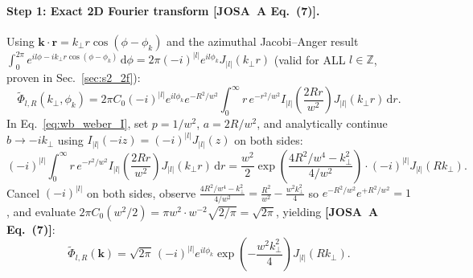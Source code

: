 \documentclass[10pt,letterpaper]{article}
\newcommand{\abs}[1]{\lvert #1 \rvert}
\newcommand{\dd}{\mathrm{d}}
\newcommand{\josa}[1]{\textbf{[JOSA~A Eq.~(#1)]}}
\numberwithin{equation}{section}
\begin{document}
\paragraph*{Step 1: Exact 2D Fourier transform \josa{7}.}
Using $\mathbf{k}\cdot\mathbf{r} = k_\perp r\cos(\phi - \phi_k)$ and the azimuthal Jacobi--Anger result $\int_0^{2\pi} e^{il\phi - ik_\perp r\cos(\phi-\phi_k)}\,\dd\phi = 2\pi(-i)^{\abs{l}} e^{il\phi_k} J_{\abs{l}}(k_\perp r)$ (valid for ALL $l \in \mathbb{Z}$, proven in Sec.~\ref{sec:s2_2f}):
\begin{equation}
  \widetilde{\Phi}_{l,R}(k_\perp,\phi_k) = 2\pi C_0 (-i)^{\abs{l}} e^{il\phi_k} e^{-R^2/w^2} \int_0^\infty r\,e^{-r^2/w^2} I_{\abs{l}}\!\left(\frac{2Rr}{w^2}\right) J_{\abs{l}}(k_\perp r)\,\dd r.
\end{equation}
In Eq.~\eqref{eq:wb_weber_I}, set $p = 1/w^2$, $a = 2R/w^2$, and analytically continue $b \to -i k_\perp$ using $I_{\abs{l}}(-i z) = (-i)^{\abs{l}} J_{\abs{l}}(z)$ on both sides:
\begin{equation}
  (-i)^{\abs{l}}\int_0^\infty r\,e^{-r^2/w^2} I_{\abs{l}}\!\left(\frac{2Rr}{w^2}\right) J_{\abs{l}}(k_\perp r)\,\dd r = \frac{w^2}{2}\exp\!\left(\frac{4R^2/w^4 - k_\perp^2}{4/w^2}\right)\cdot (-i)^{\abs{l}} J_{\abs{l}}(Rk_\perp).
\end{equation}
Cancel $(-i)^{\abs{l}}$ on both sides, observe $\frac{4R^2/w^4 - k_\perp^2}{4/w^2} = \frac{R^2}{w^2} - \frac{w^2 k_\perp^2}{4}$ so $e^{-R^2/w^2} e^{+R^2/w^2} = 1$, and evaluate $2\pi C_0(w^2/2) = \pi w^2\cdot w^{-2}\sqrt{2/\pi} = \sqrt{2\pi}$, yielding \josa{7}:
\begin{equation}
  \widetilde{\Phi}_{l,R}(\mathbf{k}) = \sqrt{2\pi}\,(-i)^{\abs{l}} e^{il\phi_k}\exp\!\left(-\frac{w^2 k_\perp^2}{4}\right) J_{\abs{l}}(R k_\perp).
\end{equation}
\end{document}
